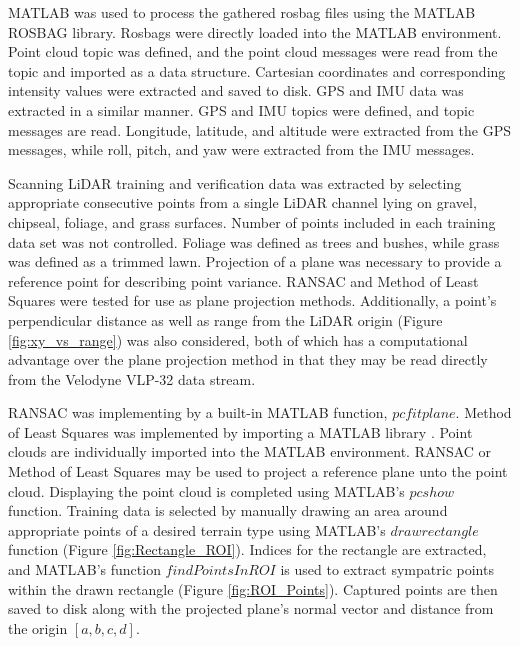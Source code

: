 \documentclass[journal,onecolumn]{IEEEtran}
\begin{document}
	{MATLAB was used to process the gathered rosbag files using the MATLAB ROSBAG library. Rosbags were directly loaded into the MATLAB environment. Point cloud topic was defined, and the point cloud messages were read from the topic and imported as a data structure. Cartesian coordinates and corresponding intensity values were extracted and saved to disk. GPS and IMU data was extracted in a similar manner. GPS and IMU topics were defined, and topic messages are read. Longitude, latitude, and altitude were extracted from the GPS messages, while roll, pitch, and yaw were extracted from the IMU messages.}
	
	{Scanning LiDAR training and verification data was extracted by selecting appropriate consecutive points from a single LiDAR channel lying on gravel, chipseal, foliage, and grass surfaces. Number of points included in each training data set was not controlled. Foliage was defined as trees and bushes, while grass was defined as a trimmed lawn. Projection of a plane was necessary to provide a reference point for describing point variance. RANSAC and Method of Least Squares were tested for use as plane projection methods. Additionally, a point's perpendicular distance as well as range from the LiDAR origin (Figure \ref{fig:xy_vs_range}) was also considered, both of which has a computational advantage over the plane projection method in that they may be read directly from the Velodyne VLP-32 data stream.}
	
	{RANSAC was implementing by a built-in MATLAB function, $pcfitplane$. Method of Least Squares was implemented by importing a MATLAB library \cite{noauthor_object-oriented_nodate}. Point clouds are individually imported into the MATLAB environment. RANSAC or Method of Least Squares may be used to project a reference plane unto the point cloud. Displaying the point cloud is completed using MATLAB's $pcshow$ function. Training data is selected by manually drawing an area around appropriate points of a desired terrain type using MATLAB's $drawrectangle$ function (Figure \ref{fig:Rectangle_ROI}). Indices for the rectangle are extracted, and MATLAB's function $findPointsInROI$ is used to extract sympatric points within the drawn rectangle (Figure \ref{fig:ROI_Points}). Captured points are then saved to disk along with the projected plane's normal vector and distance from the origin $[a,b,c,d]$.}
	
\end{document}
